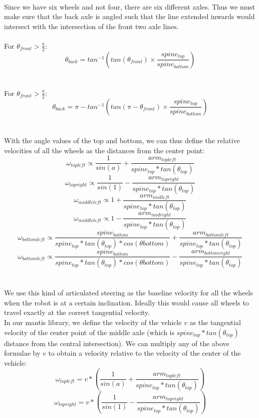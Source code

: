 \documentclass[]{article}
\begin{document}
\\
Since we have six wheels and not four, there are six different axles. Thus we must make sure that the back axle is angled such that the line extended inwards would intersect with the intersection of the front two axle lines.
\\
\\
For $\theta_{front} > \frac{\pi}{2}$:
\[ \theta_{back} = tan^{-1}(tan(\theta_{front}) \times \frac{spine_{top}}{spine_{bottom}}) \]
\\
\\
For $\theta_{front} > \frac{\pi}{2}$:
\[ \theta_{back} = \pi - tan^{-1}(tan(\pi - \theta_{front}) \times \frac{spine_{top}}{spine_{bottom}}) \]
\\
\\
With the angle values of the top and bottom, we can thus define the relative velocities of all the wheels as the distances from the center point:
\\
\[ \omega_{topleft} \propto \frac{1}{sin(a)} + \frac{arm_{topleft}}{spine_{top} * tan(\theta_{top})} \]
\[ \omega_{topright} \propto \frac{1}{sin(1)} - \frac{arm_{topright}}{spine_{top} * tan(\theta_{top})} \]
\[ \omega_{middleleft} \propto 1 + \frac{arm_{midleft}}{spine_{top} * tan(\theta_{top})} \]
\[ \omega_{middleleft} \propto 1 - \frac{arm_{midright}}{spine_{top} * tan(\theta_{top})} \]
\[ \omega_{bottomleft} \propto \frac{spine_{bottom}}{spine_{top} * tan(\theta_{top}) * cos(\theta{bottom})} + \frac{arm_{bottomleft}}{spine_{top} * tan(\theta_{top})} \]
\[ \omega_{bottomleft} \propto \frac{spine_{bottom}}{spine_{top} * tan(\theta_{top}) * cos(\theta{bottom})} - \frac{arm_{bottomright}}{spine_{top} * tan(\theta_{top})} \]
\\
\\
We use this kind of articulated steering as the baseline velocity for all the wheels when the robot is at a certain inclination. Ideally this would cause all wheels to travel exactly at the correct tangential velocity.
\\
In our mantis library, we define the velocity of the vehicle $v$ as the tangential velocity of the center point of the middle axle (which is $spine_{top} * tan(\theta_{top})$ distance from the central intersection). We can multiply any of the above formulae by $v$ to obtain a velocity relative to the velocity of the center of the vehicle:
\\
\[ \omega_{topleft} = v * (\frac{1}{sin(a)} + \frac{arm_{topleft}}{spine_{top} * tan(\theta_{top})}) \]
\[ \omega_{topright} = v * (\frac{1}{sin(1)} - \frac{arm_{topright}}{spine_{top} * tan(\theta_{top})}) \]
\end{document}
